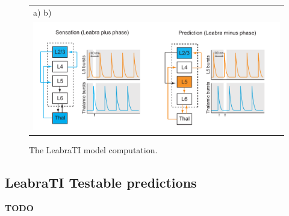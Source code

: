 \documentclass[dwyatte_dissertation.tex]{subfiles}
\begin{document}
\begin{figure}[h!]
\begin{center}
\begin{tabular}{ll}
a) \hspace{76mm} b) \\
\multicolumn{2}{c}{\includegraphics[width=160mm]{figs/chap_leabrati/leabrati_comp.pdf}} \\
\end{tabular}
\end{center}
\caption{The LeabraTI model computation.}
\label{fig:leabrati_comp}
\end{figure}

\subsection{LeabraTI Testable predictions}
\textbf{TODO}
\end{document}
